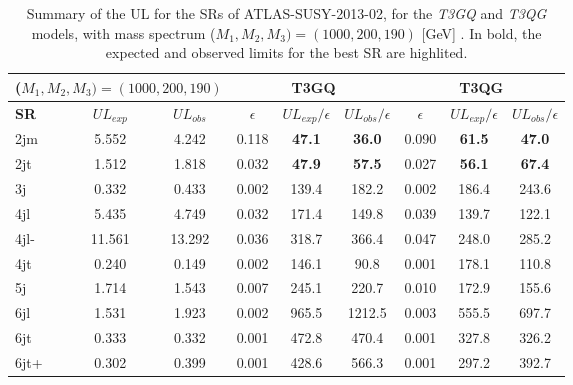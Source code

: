 \documentclass[a4paper,11pt]{article}
\begin{document}
\begin{table}[!b]
\centering
\renewcommand\arraystretch{1.3} 
\scriptsize
\begin{tabular}{ l c c    c c c  |  c c c  }
\toprule \toprule
\multicolumn{3}{c}{($M_1,M_2,M_3) = (1000,200,190)$} & \multicolumn{3}{c}{ \textbf{T3GQ}} & \multicolumn{3}{c}{ \textbf{T3QG}} \\  \toprule 
\textbf{SR} & $UL_{exp}$ & $UL_{obs}$ & $\epsilon$ &  $UL_{exp}/\epsilon$ & $UL_{obs}/\epsilon$ & $\epsilon$ & $UL_{exp}/ \epsilon$ & $UL_{obs}/ \epsilon$ \\
2jm & 5.552 &  4.242 &  0.118  & \textbf{47.1} &  \textbf{36.0}  &  0.090 &  \textbf{61.5}  & \textbf{47.0 }\\
2jt  & 1.512  & 1.818 &  0.032  & \textbf{47.9} &  \textbf{57.5}  &  0.027 &  \textbf{56.1}  & \textbf{67.4} \\
3j &  0.332 &  0.433  & 0.002 &  139.4 &  182.2  &  0.002 &  186.4 &  243.6 \\ 
4jl  & 5.435 &  4.749  & 0.032  & 171.4  & 149.8  &  0.039 &  139.7  & 122.1 \\
4jl-  & 11.561 &  13.292 &  0.036  & 318.7 &  366.4  &  0.047 &  248.0 &  285.2 \\
4jt  & 0.240  & 0.149  & 0.002  & 146.1  & 90.8 &   0.001  & 178.1  & 110.8 \\
5j  & 1.714  & 1.543  & 0.007 &  245.1 &  220.7  &  0.010  & 172.9  & 155.6 \\
6jl  & 1.531  & 1.923  & 0.002  & 965.5 &  1212.5  & 0.003  & 555.5 &  697.7 \\
6jt &  0.333  & 0.332 &  0.001  & 472.8  & 470.4 &  0.001 &  327.8  & 326.2 \\
6jt+  & 0.302 &  0.399 &  0.001  & 428.6  & 566.3  & 0.001  & 297.2  & 392.7 \\
\bottomrule \bottomrule
\end{tabular}
\caption{Summary of the UL for the SRs of ATLAS-SUSY-2013-02, for the \textit{T3GQ} and \textit{T3QG} models, with mass spectrum ($M_1,M_2,M_3) = (1000,200,190)$ [GeV] . In bold, the expected and observed limits for the best SR are highlited.}
\label{ATLAS02_UL}
\end{table}
\end{document}
